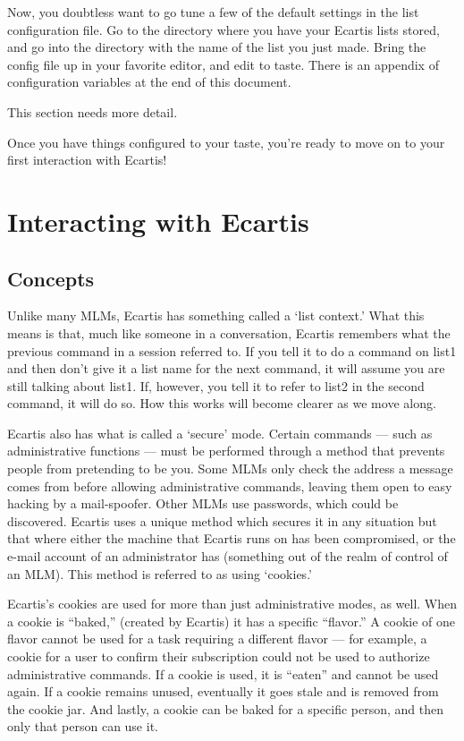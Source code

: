 \documentclass{book}
\begin{document}
Now, you doubtless want to go tune a few of the default settings in the list
configuration file.  Go to the directory where you have your Ecartis lists
stored, and go into the directory with the name of the list you just made.
Bring the config file up in your favorite editor, and edit to taste.  There is
an appendix of configuration variables at the end of this document.
   
   
This section needs more detail.
   
Once you have things configured to your taste, you're ready to move on to your
first interaction with Ecartis!
   
\chapter{Interacting with Ecartis}
\label{interface}
   
\section{Concepts}
\label{interface:concepts}
   
Unlike many MLMs, Ecartis has something called a `list context.'  What this
means is that, much like someone in a conversation, Ecartis remembers what the
previous command in a session referred to.  If you tell it to do a command on
list1 and then don't give it a list name for the next command, it will assume
you are still talking about list1.  If, however, you tell it to refer to list2
in the second command, it will do so.  How this works will become clearer as
we move along.
   
Ecartis also has what is called a `secure' mode.  Certain commands --- such as
administrative functions --- must be performed through a method that prevents
people from pretending to be you.  Some MLMs only check the address a message
comes from before allowing administrative commands, leaving them open to easy
hacking by a mail-spoofer.  Other MLMs use passwords, which could be
discovered.  Ecartis uses a unique method which secures it in any situation
but that where either the machine that Ecartis runs on has been compromised,
or the e-mail account of an administrator has (something out of the realm of
control of an MLM).  This method is referred to as using `cookies.'
   
Ecartis's cookies are used for more than just administrative modes, as well.
When a cookie is ``baked,'' (created by Ecartis) it has a specific ``flavor.''
A cookie of one flavor cannot be used for a task requiring a different flavor
--- for example, a cookie for a user to confirm their subscription could not
be used to authorize administrative commands.  If a cookie is used, it is
``eaten'' and cannot be used again.  If a cookie remains unused, eventually it
goes stale and is removed from the cookie jar.  And lastly, a cookie can be
baked for a specific person, and then only that person can use it.
   
\end{document}
